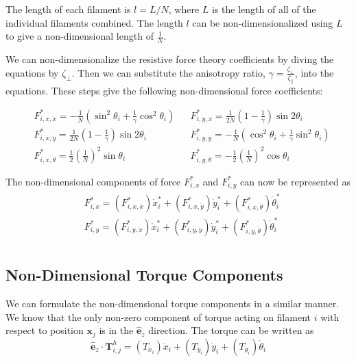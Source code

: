 \documentclass[12pt,letterpaper,titlepage]{article}
\newcommand{\uvec}[1]{\mathbf{\hat{#1}}}
\begin{document}
The length of each filament is $l = L/N$, where $L$ is the length of all of the individual filaments combined. The length $l$ can be non-dimensionalized using $L$ to give a non-dimensional length of $\frac{1}{N}$.

We can non-dimensionalize the resistive force theory coefficients by diving the equations by $\zeta_{\bot}$. Then we can substitute the anisotropy ratio, $\gamma = \frac{\zeta_{\bot}}{\zeta_{\parallel}}$, into the equations. These steps give the following non-dimensional force coefficients:

\begin{align*}
&F_{i,x,\dot{x}}^* = - \frac{1}{N} ( \sin^2 \theta_i + \frac{1}{\gamma} \cos^2 \theta_i) & &F_{i,y,\dot{x}}^* = \frac{1}{2N} (1 - \frac{1}{\gamma} ) \sin 2 \theta_i \\
&F_{i,x,\dot{y}}^* = \frac{1}{2N} (1 - \frac{1}{\gamma} ) \sin 2 \theta_i & &F_{i,y,\dot{y}}^* =  - \frac{1}{N} ( \cos^2 \theta_i + \frac{1}{\gamma} \sin^2 \theta_i) \\
&F_{i,x,\dot{\theta}}^* = \frac{1}{2} (\frac{1}{N})^2 \sin \theta_i & &F_{i,y,\dot{\theta}}^* = - \frac{1}{2} (\frac{1}{N})^2 \cos \theta_i
\end{align*}

The non-dimensional components of force $F_{i,x}^*$ and $F_{i,y}^*$ can now be represented as
\begin{align}
\begin{split}
&F_{i,x}^* = (F_{i,x,\dot{x}}^*) \dot{x}_i^* + (F_{i,x,\dot{y}}^*) \dot{y}_i^* + (F_{i,x,\dot{\theta}}^*) \dot{\theta}_i^* \\
&F_{i,y}^* = (F_{i,y,\dot{x}}^*) \dot{x}_i^* + (F_{i,y,\dot{y}}^*) \dot{y}_i^* + (F_{i,y,\dot{\theta}}^*) \dot{\theta}_i^* \\
\end{split}
\end{align}

\newpage

\subsection{Non-Dimensional Torque Components}
We can formulate the non-dimensional torque components in a similar manner. We know that the only non-zero component of torque acting on filament $i$ with respect to position $\mathbf{x}_j$ is in the $\uvec{e}_z$ direction. The torque can be written as
\begin{equation}
\uvec{e}_z \cdot \mathbf{T}_{i,j}^h = (T_{\dot{x}_i}) \dot{x}_i + (T_{\dot{y}_i}) \dot{y}_i + (T_{\dot{\theta}_i}) \dot{\theta}_i
\end{equation}
\end{document}
